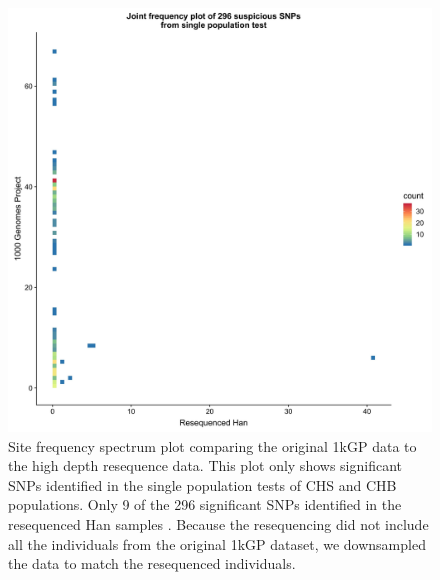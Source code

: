 \documentclass[custompaper]{MBE}%
\begin{document}
\begin{figure}[h]
\centering
\includegraphics[width=12cm,keepaspectratio]{./Figures/Han_1kGP_SFS_singlePop.jpg}
\caption{Site frequency spectrum plot comparing the original 1kGP data to the high depth resequence data. This plot only shows significant SNPs identified in the single population tests of CHS and CHB populations. Only 9 of the 296 significant SNPs identified in the resequenced Han samples \citep{Lan2017}.
Because the resequencing did not include all the individuals from the original 1kGP dataset, we downsampled the data to match the resequenced individuals.}  
\label{90HanSFS}
\end{figure}
\end{document}
